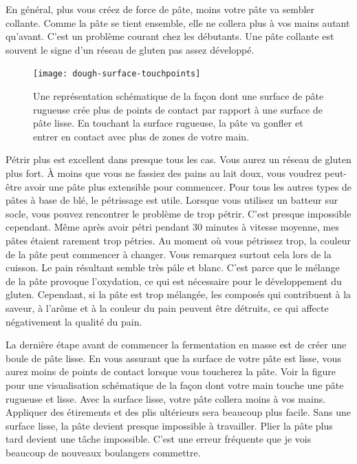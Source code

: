 En général, plus vous créez de force de pâte, moins votre pâte va
sembler collante. Comme la pâte se tient ensemble, elle ne collera plus à vos mains autant
qu'avant. C'est un problème courant chez les débutants. Une pâte collante est souvent
le signe d'un réseau de gluten pas assez développé.

\begin{figure}[!htb]
  \texttt{[image: dough-surface-touchpoints]}
  \caption[Toucher la surface de la pâte]{Une représentation schématique de la façon dont une surface de pâte rugueuse crée plus de points de contact par rapport à une surface de pâte lisse.
      En touchant la surface rugueuse, la pâte va gonfler et entrer en contact avec plus de zones de votre main.}%
  \label{fig:dough-touch-points}
\end{figure}Pétrir plus est excellent dans presque tous les cas. Vous aurez un réseau de gluten plus fort. À moins que vous ne fassiez des pains au lait doux, vous voudrez peut-être avoir une pâte plus extensible pour commencer. Pour tous les autres types de pâtes à base de blé, le pétrissage est utile. Lorsque vous utilisez un batteur sur socle, vous pouvez rencontrer le problème de trop pétrir. C'est presque impossible cependant. Même après avoir pétri pendant 30 minutes à vitesse moyenne, mes pâtes étaient rarement trop pétries. Au moment où vous pétrissez trop, la couleur de la pâte peut commencer à changer. Vous remarquez surtout cela lors de la cuisson. Le pain résultant semble très pâle et blanc. C'est parce que le mélange de la pâte provoque l'oxydation, ce qui est nécessaire pour le développement du gluten. Cependant, si la pâte est trop mélangée, les composés qui contribuent à la saveur, à l'arôme et à la couleur du pain peuvent être détruits, ce qui affecte négativement la qualité du pain.

La dernière étape avant de commencer la fermentation en masse est de créer une boule de pâte lisse. En vous assurant que la surface de votre pâte est lisse, vous aurez moins de points de contact lorsque vous toucherez la pâte. Voir la figure pour une visualisation schématique de la façon dont votre main touche une pâte rugueuse et lisse. Avec la surface lisse, votre pâte collera moins à vos mains. Appliquer des étirements et des plis ultérieurs sera beaucoup plus facile. Sans une surface lisse, la pâte devient presque impossible à travailler. Plier la pâte plus tard devient une tâche impossible. C'est une erreur fréquente que je vois beaucoup de nouveaux boulangers commettre.

